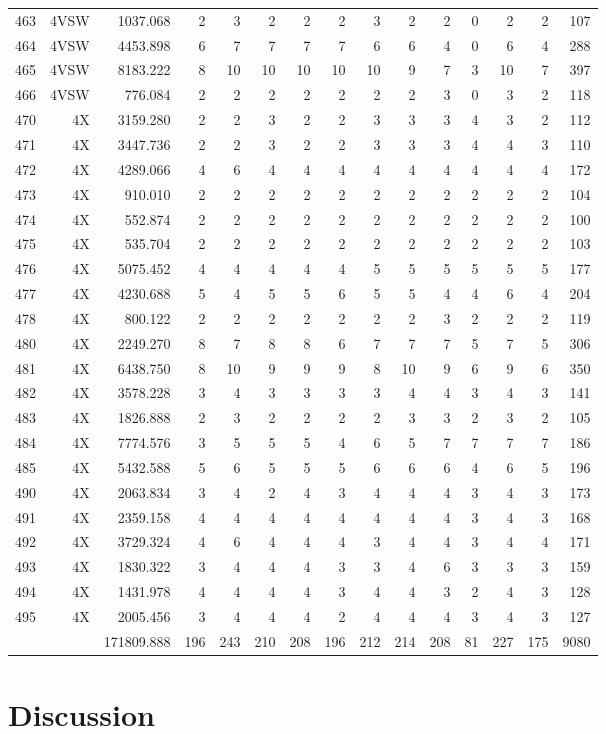 \documentclass[12pt]{article}\usepackage[]{graphicx}\usepackage[]{color}
\begin{document}
\begin{landscapepage}
\begin{longtable}[t]{crrrrrrrrrrrrrr}
463 & 4VSW & 1037.068 & 2 & 3 & 2 & 2 & 2 & 3 & 2 & 2 & 0 & 2 & 2 & 107\\
464 & 4VSW & 4453.898 & 6 & 7 & 7 & 7 & 7 & 6 & 6 & 4 & 0 & 6 & 4 & 288\\
465 & 4VSW & 8183.222 & 8 & 10 & 10 & 10 & 10 & 10 & 9 & 7 & 3 & 10 & 7 & 397\\
466 & 4VSW & 776.084 & 2 & 2 & 2 & 2 & 2 & 2 & 2 & 3 & 0 & 3 & 2 & 118\\
470 & 4X & 3159.280 & 2 & 2 & 3 & 2 & 2 & 3 & 3 & 3 & 4 & 3 & 2 & 112\\
471 & 4X & 3447.736 & 2 & 2 & 3 & 2 & 2 & 3 & 3 & 3 & 4 & 4 & 3 & 110\\
472 & 4X & 4289.066 & 4 & 6 & 4 & 4 & 4 & 4 & 4 & 4 & 4 & 4 & 4 & 172\\
473 & 4X & 910.010 & 2 & 2 & 2 & 2 & 2 & 2 & 2 & 2 & 2 & 2 & 2 & 104\\
474 & 4X & 552.874 & 2 & 2 & 2 & 2 & 2 & 2 & 2 & 2 & 2 & 2 & 2 & 100\\
475 & 4X & 535.704 & 2 & 2 & 2 & 2 & 2 & 2 & 2 & 2 & 2 & 2 & 2 & 103\\
476 & 4X & 5075.452 & 4 & 4 & 4 & 4 & 4 & 5 & 5 & 5 & 5 & 5 & 5 & 177\\
477 & 4X & 4230.688 & 5 & 4 & 5 & 5 & 6 & 5 & 5 & 4 & 4 & 6 & 4 & 204\\
478 & 4X & 800.122 & 2 & 2 & 2 & 2 & 2 & 2 & 2 & 3 & 2 & 2 & 2 & 119\\
480 & 4X & 2249.270 & 8 & 7 & 8 & 8 & 6 & 7 & 7 & 7 & 5 & 7 & 5 & 306\\
481 & 4X & 6438.750 & 8 & 10 & 9 & 9 & 9 & 8 & 10 & 9 & 6 & 9 & 6 & 350\\
482 & 4X & 3578.228 & 3 & 4 & 3 & 3 & 3 & 3 & 4 & 4 & 3 & 4 & 3 & 141\\
483 & 4X & 1826.888 & 2 & 3 & 2 & 2 & 2 & 2 & 3 & 3 & 2 & 3 & 2 & 105\\
484 & 4X & 7774.576 & 3 & 5 & 5 & 5 & 4 & 6 & 5 & 7 & 7 & 7 & 7 & 186\\
485 & 4X & 5432.588 & 5 & 6 & 5 & 5 & 5 & 6 & 6 & 6 & 4 & 6 & 5 & 196\\
490 & 4X & 2063.834 & 3 & 4 & 2 & 4 & 3 & 4 & 4 & 4 & 3 & 4 & 3 & 173\\
491 & 4X & 2359.158 & 4 & 4 & 4 & 4 & 4 & 4 & 4 & 4 & 3 & 4 & 3 & 168\\
492 & 4X & 3729.324 & 4 & 6 & 4 & 4 & 4 & 3 & 4 & 4 & 3 & 4 & 4 & 171\\
493 & 4X & 1830.322 & 3 & 4 & 4 & 4 & 3 & 3 & 4 & 6 & 3 & 3 & 3 & 159\\
494 & 4X & 1431.978 & 4 & 4 & 4 & 4 & 3 & 4 & 4 & 3 & 2 & 4 & 3 & 128\\
495 & 4X & 2005.456 & 3 & 4 & 4 & 4 & 2 & 4 & 4 & 4 & 3 & 4 & 3 & 127\\
 &  & 171809.888 & 196 & 243 & 210 & 208 & 196 & 212 & 214 & 208 & 81 & 227 & 175 & 9080\\*
\end{longtable}
\endgroup{}
\end{landscapepage}
\hypertarget{discussion}{%
\section{Discussion}\label{discussion}}
\end{document}
